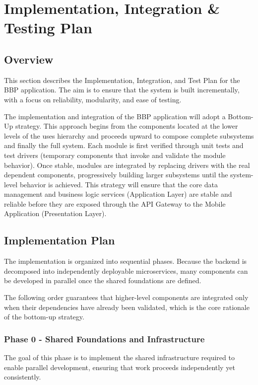 \chapter{Implementation, Integration \& Testing Plan}

\section{Overview}
This section describes the Implementation, Integration, and Test Plan for the BBP application. The aim is to ensure that the system is built incrementally, with a focus on reliability, modularity, and ease of testing.

The implementation and integration of the BBP application will adopt a Bottom-Up strategy. This approach begins from the components located at the lower levels of the uses hierarchy and proceeds upward to compose complete subsystems and finally the full system. Each module is first verified through unit tests and test drivers (temporary components that invoke and validate the module behavior). Once stable, modules are integrated by replacing drivers with the real dependent components, progressively building larger subsystems until the system-level behavior is achieved. This strategy will ensure that the core data management and business logic services (Application Layer) are stable and reliable before they are exposed through the API Gateway to the Mobile Application (Presentation Layer).


\section{Implementation Plan}
The implementation is organized into sequential phases. Because the backend is decomposed into independently deployable microservices, many components can be developed in parallel once the shared foundations are defined.

The following order guarantees that higher-level components are integrated only when their dependencies have already been validated, which is the core rationale of the bottom-up strategy.

\subsection{Phase 0 - Shared Foundations and Infrastructure}
The goal of this phase is to implement the shared infrastructure required to enable parallel development, ensuring that work proceeds independently yet consistently.

